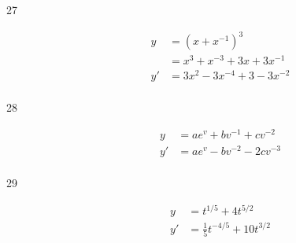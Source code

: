 \documentclass[letterpaper, landscape]{exam}
\begin{document}
\begin{description}
    \item[27] 
      \begin{align*}
        y  & = \left(x + x^{-1} \right)^3 \\
           & = x^3 + x^{-3} + 3x + 3x^{-1} \\
        y' & = \boxed{ 3x^2 - 3x^{-4} + 3 - 3x^{-2} } \\
      \end{align*}

    \item[28] 
      \begin{align*}
        y  & = ae^v + bv^{-1} + cv^{-2} \\
        y' & = \boxed{ ae^v - bv^{-2} - 2cv^{-3} } \\
      \end{align*}

    \item[29] 
      \begin{align*}
        y  & = t^{1/5} + 4t^{5/2} \\
        y' & = \boxed{ \frac{1}{5} t^{-4/5} + 10 t^{3/2} } \\
      \end{align*}





\end{description}
\end{document}
